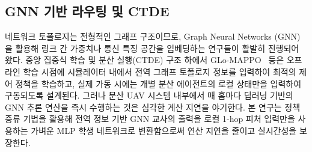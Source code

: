 \subsection{GNN 기반 라우팅 및 CTDE}
네트워크 토폴로지는 전형적인 그래프 구조이므로, Graph Neural Networks (GNN)을 활용해 링크 간 가중치나 통신 특징 공간을 임베딩하는 연구들이 활발히 진행되어 왔다. 중앙 집중식 학습 및 분산 실행(CTDE) 구조 하에서 GLo-MAPPO~\cite{glo_mappo} 등은 오프라인 학습 시점에 시뮬레이터 내에서 전역 그래프 토폴로지 정보를 입력하여 최적의 제어 정책을 학습하고, 실제 가동 시에는 개별 분산 에이전트의 로컬 상태만을 입력하여 구동되도록 설계된다. 그러나 분산 UAV 시스템 내부에서 매 홉마다 딥러닝 기반의 GNN 추론 연산을 즉시 수행하는 것은 심각한 계산 지연을 야기한다. 본 연구는 정책 증류 기법을 활용해 전역 정보 기반 GNN 교사의 출력을 로컬 1-hop 피처 입력만을 사용하는 가벼운 MLP 학생 네트워크로 변환함으로써 연산 지연을 줄이고 실시간성을 보장한다.

